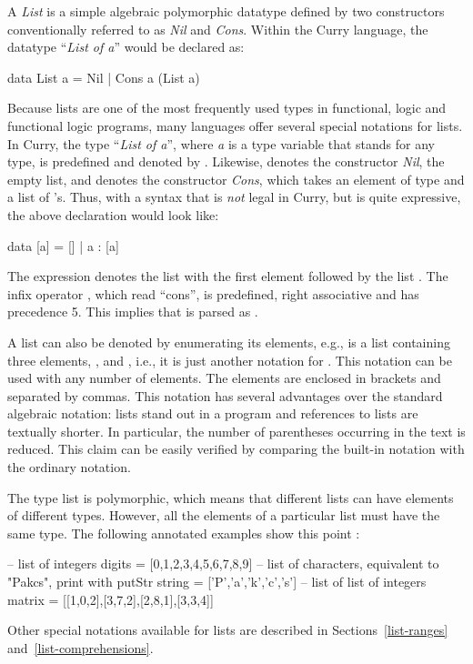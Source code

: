 A \emph{List} is a simple algebraic polymorphic
datatype defined by two constructors conventionally referred to
as \emph{Nil} and \emph{Cons}.
Within the Curry language, the datatype ``\emph{List of a}''
would be declared as:
%
\begin{prog}
data List a = Nil | Cons a (List a)
\end{prog}
%
Because lists are one of the most frequently used types in
functional, logic and functional logic programs,
many languages offer several special notations for lists.
In Curry, the type ``\emph{List of a}'',
where \emph{a} is a type variable that stands for any type,
is predefined and denoted by \code{[a]}.
Likewise, \code{[]} denotes the constructor \emph{Nil}, the empty list,
and \ccode{:}\pindex{:} denotes the constructor \emph{Cons}, which
takes an element of type  and a list of 's.
Thus, with a syntax that is \emph{not} legal in Curry, but
is quite expressive, the above declaration would look like:
%
\begin{prog}
data [a] = [] | a : [a]
\end{prog}
%
The expression  denotes the list with the first element 
followed by the list .
The infix operator \ccode{:}, which read ``cons'',
is predefined, right associative and has precedence 5.
This implies that  is parsed as .

A list can also be denoted by enumerating its
elements, e.g.,
\ccode{[u,v,w]} is a list containing three elements,
,  and , i.e., it is just another
notation for .
This notation can be used with any number of elements.
The elements are enclosed in brackets and separated by commas.
This notation has several advantages over the standard algebraic
notation: lists stand out in a program and references to lists
are textually shorter.  In particular, the number of parentheses
occurring in the text is reduced.
This claim can be easily verified by comparing the built-in
notation with the ordinary notation.

The type list is polymorphic, which means that
different lists can have elements of different types.
However, all the elements of a particular list must have the same type.
The following annotated examples show this point
:
%
\begin{prog}
-- list of integers
digits = [0,1,2,3,4,5,6,7,8,9]
\vspace*{1.5ex}
-- list of characters, equivalent to "Pakcs", print with putStr
string = ['P','a','k','c','s'] 
\vspace*{1.5ex}
-- list of list of integers
matrix = [[1,0,2],[3,7,2],[2,8,1],[3,3,4]]
\end{prog}
%
Other special notations available for lists are described in 
Sections~\ref{list-ranges} and~\ref{list-comprehensions}.

